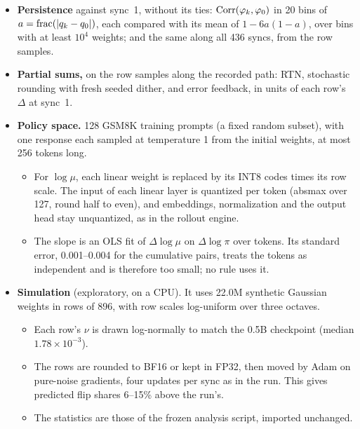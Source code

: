 \begin{itemize}[leftmargin=*,itemsep=2pt]
\item \textbf{Persistence} against sync~1, without its ties: $\operatorname{Corr}(\varphi_k,\varphi_0)$ in 20 bins of $a=\operatorname{frac}(|q_k-q_0|)$, each compared with its mean of $1-6a(1-a)$, over bins with at least $10^4$ weights; and the same along all 436 syncs, from the row samples.
\item \textbf{Partial sums,} on the row samples along the recorded path: RTN, stochastic rounding with fresh seeded dither, and error feedback, in units of each row's $\Delta$ at sync~1.
\item \textbf{Policy space.} 128 GSM8K training prompts (a fixed random subset), with one response each sampled at temperature 1 from the initial weights, at most 256 tokens long.
  \begin{itemize}[leftmargin=*,itemsep=1pt]
  \item For $\log\mu$, each linear weight is replaced by its INT8 codes times its row scale. The input of each linear layer is quantized per token (absmax over 127, round half to even), and embeddings, normalization and the output head stay unquantized, as in the rollout engine.
  \item The slope is an OLS fit of $\Delta\log\mu$ on $\Delta\log\pi$ over tokens. Its standard error, 0.001--0.004 for the cumulative pairs, treats the tokens as independent and is therefore too small; no rule uses it.
  \end{itemize}
\item \textbf{Simulation} (exploratory, on a CPU). It uses 22.0M synthetic Gaussian weights in rows of 896, with row scales log-uniform over three octaves.
  \begin{itemize}[leftmargin=*,itemsep=1pt]
  \item Each row's $\nu$ is drawn log-normally to match the 0.5B checkpoint (median $1.78\times10^{-3}$).
  \item The rows are rounded to BF16 or kept in FP32, then moved by Adam on pure-noise gradients, four updates per sync as in the run. This gives predicted flip shares 6--15\% above the run's.
  \item The statistics are those of the frozen analysis script, imported unchanged.
  \end{itemize}
\end{itemize}
